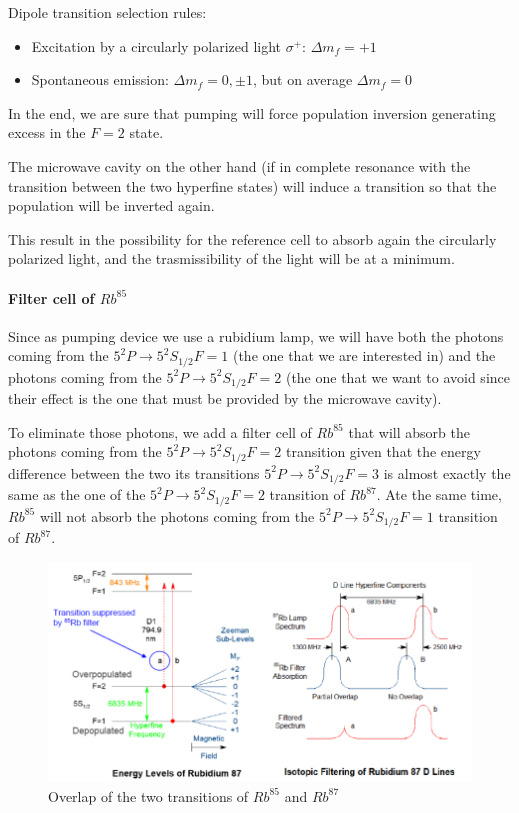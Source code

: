 Dipole transition selection rules:
\begin{itemize}
    \item Excitation by a circularly polarized light $\sigma^+$: $\Delta m_f = +1$
    \item Spontaneous emission: $\Delta m_f = 0, \pm 1$, but on average $\Delta m_f = 0$
\end{itemize}

In the end, we are sure that pumping will force population inversion generating excess in the $F=2$ state.

The microwave cavity on the other hand (if in complete resonance with the transition between the two hyperfine states) will induce a transition so that the population will be inverted again.

This result in the possibility for the reference cell to absorb again the circularly polarized light, and the trasmissibility of the light will be at a minimum.

\paragraph{Filter cell of $Rb^{85}$}

Since as pumping device we use a rubidium lamp, we will have both the photons coming from the $5^2P \rightarrow 5^2S_{1/2} F=1$ (the one that we are interested in) and the photons coming from the $5^2P \rightarrow 5^2S_{1/2} F=2$ (the one that we want to avoid since their effect is the one that must be provided by the microwave cavity).

To eliminate those photons, we add a filter cell of $Rb^{85}$ that will absorb the photons coming from the $5^2P \rightarrow 5^2S_{1/2} F=2$ transition given that the energy difference between the two its transitions $5^2P \rightarrow 5^2S_{1/2} F=3$ is almost exactly the same as the one of the $5^2P \rightarrow 5^2S_{1/2} F=2$ transition of $Rb^{87}$.
Ate the same time, $Rb^{85}$ will not absorb the photons coming from the $5^2P \rightarrow 5^2S_{1/2} F=1$ transition of $Rb^{87}$.

\begin{figure}[H]
    \centering
    \includegraphics[width=\linewidth]{img/02.2-overlap-for-filtering-rubidium}
    \caption{Overlap of the two transitions of $Rb^{85}$ and $Rb^{87}$}
    \label{fig:overlap-for-filtering-rubidium}
\end{figure}

